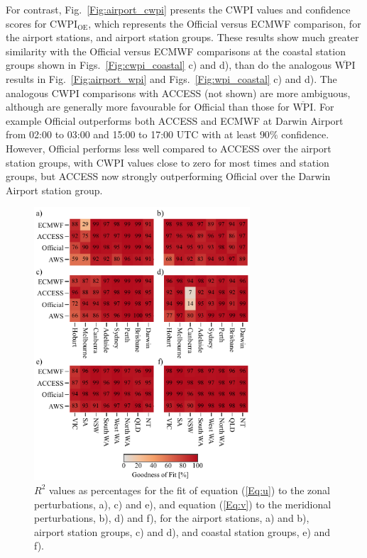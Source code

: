 \documentclass[twocol]{ametsoc}
\begin{document}
For contrast, Fig.~\ref{Fig:airport_cwpi} presents the CWPI values and confidence scores for $\text{CWPI}_\text{OE}$, which represents the Official versus ECMWF comparison, for the airport stations, and airport station groups. These results show much greater similarity with the Official versus ECMWF comparisons at the coastal station groups shown in Figs.~\ref{Fig:cwpi_coastal} c) and d), than do the analogous $\overline{\text{WPI}}$ results in Fig.~\ref{Fig:airport_wpi} and Figs.~\ref{Fig:wpi_coastal} c) and d). The analogous CWPI comparisons with ACCESS (not shown) are more ambiguous, although are generally more favourable for Official than those for $\overline{\text{WPI}}$. For example Official outperforms both ACCESS and ECMWF at Darwin Airport from 02:00 to 03:00 and 15:00 to 17:00 UTC with at least $90\%$ confidence. However, Official performs less well compared to ACCESS over the airport station groups, with CWPI values close to zero for most times and station groups, but ACCESS now strongly outperforming Official over the Darwin Airport station group.  

\begin{figure}
\centering
\includegraphics[width=19pc]{r_squared.pdf}
\caption{$R^2$ values as percentages for the fit of equation (\ref{Eq:u}) to the zonal perturbations, a), c) and e), and equation (\ref{Eq:v}) to the meridional perturbations, b), d) and f), for the airport stations, a) and b), airport station groups, c) and d), and coastal station groups, e) and f).}
\label{Fig:r_squared}
\end{figure}
\end{document}
